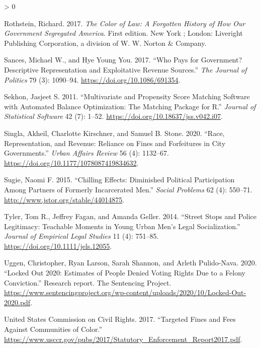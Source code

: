 \documentclass[
  12pt,
]{article}
\newlength{\cslhangindent}
\newenvironment{CSLReferences}[2] %
 {%
  \setlength{\parindent}{0pt}
  \ifodd #1 \everypar{\setlength{\hangindent}{\cslhangindent}}\ignorespaces\fi
  \ifnum #2 > 0
  \setlength{\parskip}{#2\baselineskip}
  \fi
 }%
 {}
\begin{document}
\begin{CSLReferences}{1}{0}
\leavevmode\hypertarget{ref-Rothstein2017}{}%
Rothstein, Richard. 2017. \emph{The Color of Law: A Forgotten History of How Our Government Segregated {America}}. First edition. {New York ; London}: {Liveright Publishing Corporation, a division of W. W. Norton \& Company}.

\leavevmode\hypertarget{ref-Sances2017}{}%
Sances, Michael W., and Hye Young You. 2017. {``Who {Pays} for {Government}? {Descriptive Representation} and {Exploitative Revenue Sources}.''} \emph{The Journal of Politics} 79 (3): 1090--94. \url{https://doi.org/10.1086/691354}.

\leavevmode\hypertarget{ref-Sekhon2011}{}%
Sekhon, Jasjeet S. 2011. {``Multivariate and {Propensity Score Matching Software} with {Automated Balance Optimization}: {The Matching} Package for {R}.''} \emph{Journal of Statistical Software} 42 (7): 1--52. \url{https://doi.org/10.18637/jss.v042.i07}.

\leavevmode\hypertarget{ref-Singla2020}{}%
Singla, Akheil, Charlotte Kirschner, and Samuel B. Stone. 2020. {``Race, {Representation}, and {Revenue}: {Reliance} on {Fines} and {Forfeitures} in {City Governments}.''} \emph{Urban Affairs Review} 56 (4): 1132--67. \url{https://doi.org/10.1177/1078087419834632}.

\leavevmode\hypertarget{ref-Sugie2015}{}%
Sugie, Naomi F. 2015. {``Chilling {Effects}: {Diminished Political Participation} Among {Partners} of {Formerly Incarcerated Men}.''} \emph{Social Problems} 62 (4): 550--71. \url{http://www.jstor.org/stable/44014875}.

\leavevmode\hypertarget{ref-Tyler2014}{}%
Tyler, Tom R., Jeffrey Fagan, and Amanda Geller. 2014. {``Street {Stops} and {Police Legitimacy}: {Teachable Moments} in {Young Urban Men}'s {Legal Socialization}.''} \emph{Journal of Empirical Legal Studies} 11 (4): 751--85. \url{https://doi.org/10.1111/jels.12055}.

\leavevmode\hypertarget{ref-Uggen2020}{}%
Uggen, Christopher, Ryan Larson, Sarah Shannon, and Arleth Pulido-Nava. 2020. {``Locked {Out} 2020: {Estimates} of {People Denied Voting Rights Due} to a {Felony Conviction}.''} Research report. {The Sentencing Project}. \url{https://www.sentencingproject.org/wp-content/uploads/2020/10/Locked-Out-2020.pdf}.

\leavevmode\hypertarget{ref-UnitedStatesCommissiononCivilRights2017}{}%
United States Commission on Civil Rights. 2017. {``Targeted {Fines} and {Fees Against Communities} of {Color}.''} \url{https://www.usccr.gov/pubs/2017/Statutory_Enforcement_Report2017.pdf}.


\end{CSLReferences}
\end{document}
